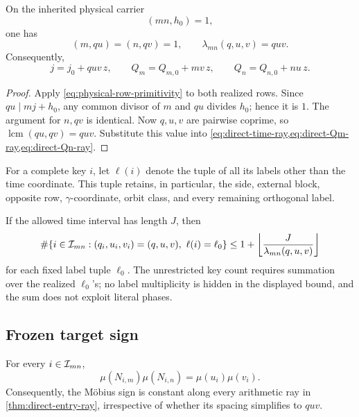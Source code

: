 \begin{corollary}
\label{cor:primitive-row-spacing}
On the inherited physical carrier
\[
 (mn,h_0)=1,
\]
one has
\[
 (m,qu)=(n,qv)=1,\qquad
 \lambda_{mn}(q,u,v)=quv.
\]
Consequently,
\[
 j=j_0+quv\,z,\qquad
 Q_m=Q_{m,0}+mv\,z,\qquad
 Q_n=Q_{n,0}+nu\,z.
\]
\end{corollary}

\begin{proof}
Apply \eqref{eq:physical-row-primitivity} to both realized rows.
Since \(qu\mid mj+h_0\), any common divisor of \(m\) and \(qu\) divides
\(h_0\); hence it is \(1\).  The argument for \(n,qv\) is identical.
Now \(q,u,v\) are pairwise coprime, so
\(\operatorname{lcm}(qu,qv)=quv\).  Substitute this value into
\cref{eq:direct-time-ray,eq:direct-Qm-ray,eq:direct-Qn-ray}.
\end{proof}

\noindent
For a complete key \(i\), let \(\ell(i)\) denote the tuple of all its
labels other than the time coordinate.  This tuple retains, in
particular, the side, external block, opposite row, \(\gamma\)-coordinate,
orbit class, and every remaining orthogonal label.

\begin{corollary}
\label{cor:direct-ray-census}
If the allowed time interval has length \(J\), then
\[
 \#\{i\in\mathcal I_{mn}:
       (q_i,u_i,v_i)=(q,u,v),\ \ell(i)=\ell_0\}
 \le
 1+\left\lfloor\frac{J}{\lambda_{mn}(q,u,v)}\right\rfloor
\]
for each fixed label tuple \(\ell_0\).  The unrestricted key count
requires summation over the realized \(\ell_0\)'s; no label multiplicity
is hidden in the displayed bound, and the sum does not exploit literal
phases.
\end{corollary}

\subsection{Frozen target sign}

\begin{theorem}
\label{thm:direct-key-sign}
For every \(i\in\mathcal I_{mn}\),
\begin{equation}
 \boxed{
 \mu(N_{i,m})\mu(N_{i,n})
 =
 \mu(u_i)\mu(v_i).}
 \label{eq:direct-primitive-sign}
\end{equation}
Consequently, the M\"obius sign is constant along every arithmetic ray in
\cref{thm:direct-entry-ray}, irrespective of whether its spacing
simplifies to \(quv\).
\end{theorem}

